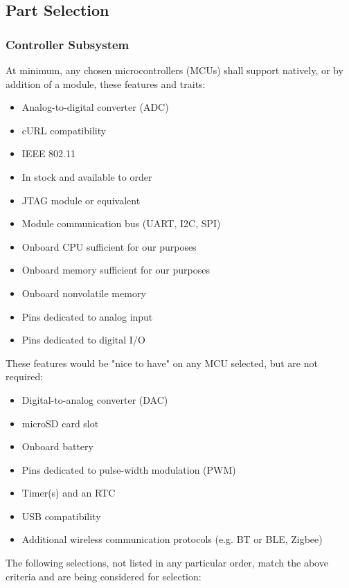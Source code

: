 \subsection{Part Selection}
\subsubsection{Controller Subsystem}
At minimum, any chosen microcontrollers (MCUs) shall support natively, or by addition of a
module, these features and traits:
\begin{itemize}
    \item Analog-to-digital converter (ADC)
    \item cURL compatibility
    \item IEEE 802.11
    \item In stock and available to order
    \item JTAG module or equivalent
    \item Module communication bus (UART, I2C, SPI)
    \item Onboard CPU sufficient for our purposes
    \item Onboard memory sufficient for our purposes
    \item Onboard nonvolatile memory
    \item Pins dedicated to analog input
    \item Pins dedicated to digital I/O
\end{itemize}
These features would be "nice to have" on any MCU selected, but are not required:
\begin{itemize}
    \item Digital-to-analog converter (DAC)
    \item microSD card slot
    \item Onboard battery
    \item Pins dedicated to pulse-width modulation (PWM)
    \item Timer(s) and an RTC
    \item USB compatibility
    \item Additional wireless communication protocols (e.g. BT or BLE, Zigbee)
\end{itemize}
The following selections, not listed in any particular order, match the above criteria and are
being considered for selection:	
